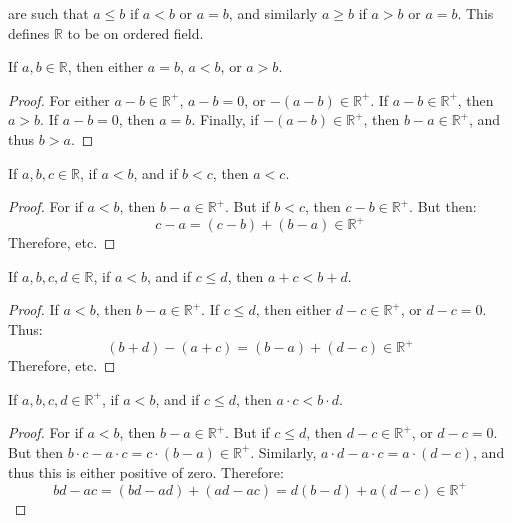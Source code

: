\documentclass[crop=false,class=book,oneside]{standalone}
\begin{document}
            are such that $a\leq{b}$ if $a<b$ or $a=b$, and
            similarly $a\geq{b}$ if $a>b$ or $a=b$. This defines
            $\mathbb{R}$ to be on ordered field.
            \begin{theorem}
                If $a,b\in\mathbb{R}$, then either $a=b$, $a<b$, or
                $a>b$.
            \end{theorem}
            \begin{proof}
                For either $a-b\in\mathbb{R}^{+}$, $a-b=0$, or
                $\minus(a-b)\in\mathbb{R}^{+}$. If
                $a-b\in\mathbb{R}^{+}$, then $a>b$. If $a-b=0$, then
                $a=b$. Finally, if $\minus(a-b)\in\mathbb{R}^{+}$,
                then $b-a\in\mathbb{R}^{+}$, and thus $b>a$.
            \end{proof}
            \begin{theorem}
                If $a,b,c\in\mathbb{R}$, if $a<b$, and if $b<c$, then
                $a<c$.
            \end{theorem}
            \begin{proof}
                For if $a<b$, then $b-a\in\mathbb{R}^{+}$. But if
                $b<c$, then $c-b\in\mathbb{R}^{+}$. But then:
                \begin{equation}
                    c-a=(c-b)+(b-a)\in\mathbb{R}^{+}
                \end{equation}
                Therefore, etc.
            \end{proof}
            \begin{theorem}
                If $a,b,c,d\in\mathbb{R}$, if $a<b$, and if
                $c\leq{d}$, then $a+c<b+d$.
            \end{theorem}
            \begin{proof}
                If $a<b$, then $b-a\in\mathbb{R}^{+}$. If $c\leq{d}$,
                then either $d-c\in\mathbb{R}^{+}$, or $d-c=0$. Thus:
                \begin{equation}
                    (b+d)-(a+c)=(b-a)+(d-c)\in\mathbb{R}^{+}
                \end{equation}
                Therefore, etc.
            \end{proof}
            \begin{theorem}
                If $a,b,c,d\in\mathbb{R}^{+}$, if $a<b$, and if
                $c\leq{d}$, then $a\cdot{c}<b\cdot{d}$.
            \end{theorem}
            \begin{proof}
                For if $a<b$, then $b-a\in\mathbb{R}^{+}$. But if
                $c\leq{d}$, then $d-c\in\mathbb{R}^{+}$, or
                $d-c=0$. But then
                $b\cdot{c}-a\cdot{c}=c\cdot(b-a)\in\mathbb{R}^{+}$.
                Similarly,
                $a\cdot{d}-a\cdot{c}=a\cdot(d-c)$, and thus this is
                either positive of zero. Therefore:
                \begin{equation}
                    bd-ac=(bd-ad)+(ad-ac)=
                    d(b-d)+a(d-c)\in\mathbb{R}^{+}
                \end{equation}
            \end{proof}
\end{document}
